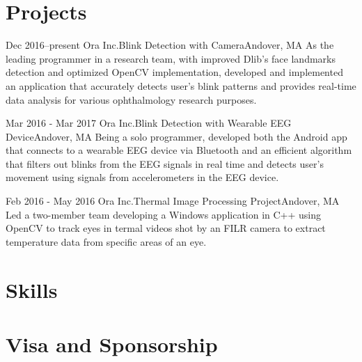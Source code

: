 \documentclass[10pt,a4paper,merriweather]{moderncv}        %
\begin{document}
\section{Projects}

\cventry
{Dec 2016--present}
{Ora Inc.}{Blink Detection with Camera}{Andover, MA}{}
{As the leading programmer in a research team, with improved Dlib's face landmarks detection and optimized OpenCV implementation, developed and implemented an application that accurately detects user's blink patterns and provides real-time data analysis for various ophthalmology research purposes.}
\vspace{.15cm}

\cventry
{Mar 2016 - Mar 2017}
{Ora Inc.}{Blink Detection with Wearable EEG Device}{Andover, MA}{}
{Being a solo programmer, developed both the Android app that connects to a wearable EEG device via Bluetooth and an efficient algorithm that filters out blinks from the EEG signals in real time and detects user's movement using signals from accelerometers in the EEG device.}
\vspace{.15cm}

\cventry
{Feb 2016 - May 2016}
{Ora Inc.}{Thermal Image Processing Project}{Andover, MA}{}
{Led a two-member team developing a Windows application in C++ using OpenCV to track eyes in termal videos shot by an FILR camera to extract temperature data from specific areas of an eye. }
\vspace{.15cm}


\section{Skills}


\section{Visa and Sponsorship}
\end{document}
